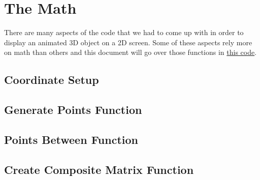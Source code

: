 \documentclass[14pt]{article}
\begin{document}
\newpage

\section*{The Math}

There are many aspects of the code that we had to come up with in order to display an animated 3D object on a 2D screen. Some of these aspects rely more on math than others and this document will go over those functions in \textcolor{blue}{\href{https://github.com/itsmehere/SpinningCube/blob/main/cubeProj.py}{this code}}.

\subsection*{Coordinate Setup}



\subsection*{Generate Points Function}



\subsection*{Points Between Function}



\subsection*{Create Composite Matrix Function}
\end{document}
